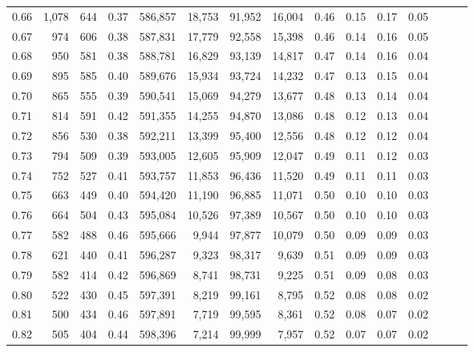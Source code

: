 \begin{tabular}{rrrrrrrrrrrrrrr}
0.66 &   1,078 &    644 &  0.37 &  586,857 &   18,753 &   91,952 &   16,004 &  0.46 &  0.15 &  0.17 &      0.05 \\
0.67 &     974 &    606 &  0.38 &  587,831 &   17,779 &   92,558 &   15,398 &  0.46 &  0.14 &  0.16 &      0.05 \\
0.68 &     950 &    581 &  0.38 &  588,781 &   16,829 &   93,139 &   14,817 &  0.47 &  0.14 &  0.16 &      0.04 \\
0.69 &     895 &    585 &  0.40 &  589,676 &   15,934 &   93,724 &   14,232 &  0.47 &  0.13 &  0.15 &      0.04 \\
0.70 &     865 &    555 &  0.39 &  590,541 &   15,069 &   94,279 &   13,677 &  0.48 &  0.13 &  0.14 &      0.04 \\
0.71 &     814 &    591 &  0.42 &  591,355 &   14,255 &   94,870 &   13,086 &  0.48 &  0.12 &  0.13 &      0.04 \\
0.72 &     856 &    530 &  0.38 &  592,211 &   13,399 &   95,400 &   12,556 &  0.48 &  0.12 &  0.12 &      0.04 \\
0.73 &     794 &    509 &  0.39 &  593,005 &   12,605 &   95,909 &   12,047 &  0.49 &  0.11 &  0.12 &      0.03 \\
0.74 &     752 &    527 &  0.41 &  593,757 &   11,853 &   96,436 &   11,520 &  0.49 &  0.11 &  0.11 &      0.03 \\
0.75 &     663 &    449 &  0.40 &  594,420 &   11,190 &   96,885 &   11,071 &  0.50 &  0.10 &  0.10 &      0.03 \\
0.76 &     664 &    504 &  0.43 &  595,084 &   10,526 &   97,389 &   10,567 &  0.50 &  0.10 &  0.10 &      0.03 \\
0.77 &     582 &    488 &  0.46 &  595,666 &    9,944 &   97,877 &   10,079 &  0.50 &  0.09 &  0.09 &      0.03 \\
0.78 &     621 &    440 &  0.41 &  596,287 &    9,323 &   98,317 &    9,639 &  0.51 &  0.09 &  0.09 &      0.03 \\
0.79 &     582 &    414 &  0.42 &  596,869 &    8,741 &   98,731 &    9,225 &  0.51 &  0.09 &  0.08 &      0.03 \\
0.80 &     522 &    430 &  0.45 &  597,391 &    8,219 &   99,161 &    8,795 &  0.52 &  0.08 &  0.08 &      0.02 \\
0.81 &     500 &    434 &  0.46 &  597,891 &    7,719 &   99,595 &    8,361 &  0.52 &  0.08 &  0.07 &      0.02 \\
0.82 &     505 &    404 &  0.44 &  598,396 &    7,214 &   99,999 &    7,957 &  0.52 &  0.07 &  0.07 &      0.02 \\

\end{tabular}
